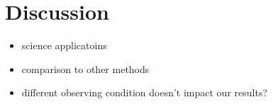 \section{Discussion} \label{sec:discuss}
\begin{itemize}
    \item science applicatoins 
    \item comparison to other methods 
    \item different observing condition doesn't impact our results? 
\end{itemize}

